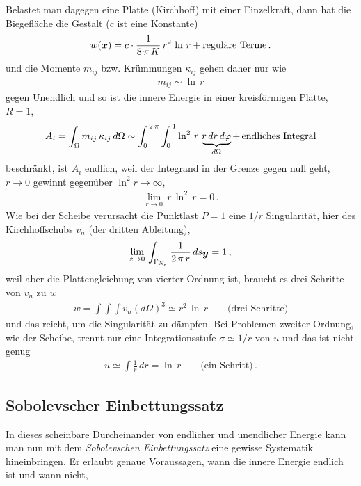 {{{{{Belastet man dagegen eine Platte (Kirchhoff) mit einer Einzelkraft, dann hat die Biegefl\"{a}che die Gestalt ($c $ ist eine Konstante)
\begin{align}
w(\mbox{\boldmath $x$}) = c \cdot \frac{1}{8\,\pi\,K}\,r^2\,\ln\,r + \text{regul\"{a}re Terme}\,.
\end{align}
und die Momente $m_{ij}$ bzw. Kr\"{u}mmungen $\kappa_{ij}$ gehen daher \glq nur\grq{} wie
\begin{align}
m_{ij} \sim \ln\,r
\end{align}
gegen Unendlich und so ist die innere Energie in einer kreisf\"{o}rmigen Platte, $R = 1$,
\begin{align}
A_i = \int_{\Omega} m_{ij}\,\kappa_{ij} \,d\Omega  \sim \int_0^{\,2\,\pi} \int_0^{\,1} \ln^2\,r\,\underbrace{r\,dr\,d\varphi}_{d \Omega} + \,\text{endliches Integral}
\end{align}
beschr\"{a}nkt, ist $A_i$ endlich, weil der Integrand in der Grenze gegen null geht, $r \to 0$ gewinnt gegen\"{u}ber $\ln^2 r \to \infty$,
\begin{align}
\lim_{r \to 0}\,r\,\ln^2\,r = 0\,.
\end{align}
Wie bei der Scheibe verursacht die Punktlast $P = 1$ eine $1/r$ Singularit\"{a}t, hier des Kirchhoffschubs $v_n$ (der \glq dritten\grq{} Ableitung),
\begin{align}
\lim_{\varepsilon \to 0}\,\int_{\Gamma_{N_\varepsilon}} \frac{1}{2\,\pi\,r}\,ds_{\mbox{\boldmath $y$}} = 1\,,
\end{align}
weil aber die Plattengleichung von vierter Ordnung ist, braucht es drei Schritte von $v_n$ zu $w$
\begin{align}
w = \int \int \int v_n (d\Omega)^3 \simeq r^2\,\ln\,r\qquad\text{(drei Schritte)}
\end{align}
und das reicht, um die Singularit\"{a}t zu d\"{a}mpfen. Bei Problemen zweiter Ordnung, wie der Scheibe, trennt nur eine Integrationsstufe $\sigma \simeq 1/r$ von $u$ und das ist nicht genug
\begin{align}
u \simeq \int \frac{1}{r}\,dr = \ln\,r \qquad\text{(ein Schritt)}\,.
\end{align}
{\textcolor{sectionTitleBlue}{\section{Sobolevscher Einbettungssatz}}}
In dieses scheinbare Durcheinander von endlicher und unendlicher Energie kann man nun mit dem {\em Sobolevschen Einbettungssatz\/} eine gewisse Systematik hineinbringen. Er erlaubt genaue Voraussagen, wann die innere Energie endlich ist und wann nicht, \cite{Ha6}.

}}}}}
